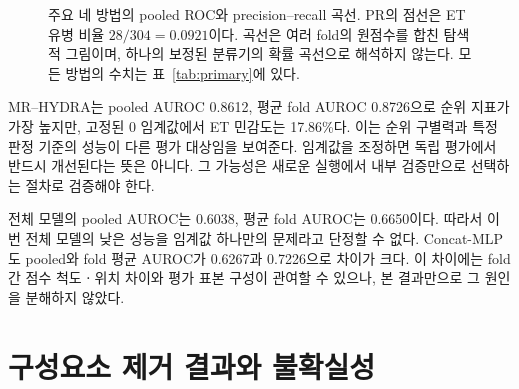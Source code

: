 \documentclass[11pt,a4paper]{article}
\numberwithin{equation}{section}
\begin{document}
\begin{figure}[H]
\caption{주요 네 방법의 pooled ROC와 precision--recall 곡선.
PR의 점선은 ET 유병 비율 $28/304=0.0921$이다.
곡선은 여러 fold의 원점수를 합친 탐색적 그림이며, 하나의 보정된 분류기의
확률 곡선으로 해석하지 않는다. 모든 방법의 수치는 표~\ref{tab:primary}에 있다.}
\label{fig:curves}
\end{figure}
MR--HYDRA는 pooled AUROC 0.8612, 평균 fold AUROC 0.8726으로 순위 지표가
가장 높지만, 고정된 0 임계값에서 ET 민감도는 17.86\%다.
이는 순위 구별력과 특정 판정 기준의 성능이 다른 평가 대상임을 보여준다.
임계값을 조정하면 독립 평가에서 반드시 개선된다는 뜻은 아니다.
그 가능성은 새로운 실행에서 내부 검증만으로 선택하는 절차로 검증해야 한다.

전체 모델의 pooled AUROC는 0.6038, 평균 fold AUROC는 0.6650이다.
따라서 이번 전체 모델의 낮은 성능을 임계값 하나만의 문제라고 단정할 수 없다.
Concat-MLP도 pooled와 fold 평균 AUROC가 0.6267과 0.7226으로 차이가 크다.
이 차이에는 fold 간 점수 척도ㆍ위치 차이와 평가 표본 구성이 관여할 수 있으나,
본 결과만으로 그 원인을 분해하지 않았다.

\section{구성요소 제거 결과와 불확실성}
\end{document}
